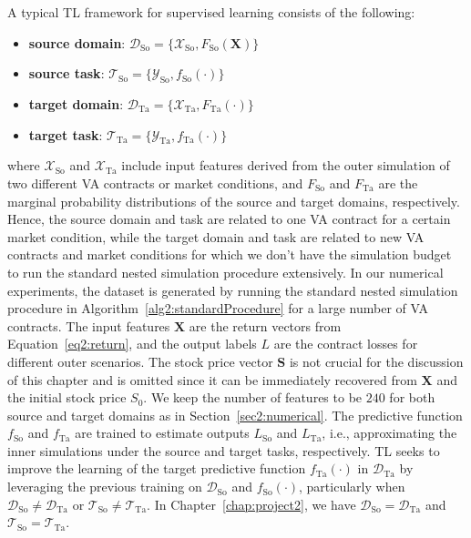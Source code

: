 A typical TL framework for supervised learning consists of the following:
\begin{itemize}
    \item   \textbf{source domain}: $\mathcal{D}_{\text{So}} = \{\mathcal{X}_{\text{So}}, F_{\text{So}}(\mathbf{X})\}$
    \item   \textbf{source task}: $\mathcal{T}_{\text{So}} = \{\mathcal{Y}_{\text{So}}, f_{\text{So}}(\cdot)\}$
    \item   \textbf{target domain}: $\mathcal{D}_{\text{Ta}} = \{\mathcal{X}_{\text{Ta}}, F_{\text{Ta}}(\cdot)\}$
    \item   \textbf{target task}: $\mathcal{T}_{\text{Ta}} = \{\mathcal{Y}_{\text{Ta}}, f_{\text{Ta}}(\cdot)\}$
\end{itemize}
where $\mathcal{X}_{\text{So}}$ and $\mathcal{X}_{\text{Ta}}$ include input features derived from the outer simulation of two different VA contracts or market conditions, and $F_{\text{So}}$ and $F_{\text{Ta}}$ are the marginal probability distributions of the source and target domains, respectively.
Hence, the source domain and task are related to one VA contract for a certain market condition, while the target domain and task are related to new VA contracts and market conditions for which we don't have the simulation budget to run the standard nested simulation procedure extensively.
In our numerical experiments, the dataset is generated by running the standard nested simulation procedure in Algorithm~\ref{alg2:standardProcedure} for a large number of VA contracts.
The input features $\mathbf{X}$ are the return vectors from Equation~\eqref{eq2:return}, and the output labels $L$ are the contract losses for different outer scenarios.
The stock price vector $\mathbf{S}$ is not crucial for the discussion of this chapter and is omitted since it can be immediately recovered from $\mathbf{X}$ and the initial stock price $S_0$.
We keep the number of features to be $\num{240}$ for both source and target domains as in Section~\ref{sec2:numerical}.
The predictive function $f_{\text{So}}$ and $f_{\text{Ta}}$ are trained to estimate outputs $L_{\text{So}}$ and $L_{\text{Ta}}$, i.e., approximating the inner simulations under the source and target tasks, respectively.
TL seeks to improve the learning of the target predictive function $f_{\text{Ta}}(\cdot)$ in $\mathcal{D}_{\text{Ta}}$ by leveraging the previous training on $\mathcal{D}_{\text{So}}$ and $f_{\text{So}}(\cdot)$, particularly when $\mathcal{D}_{\text{So}} \neq \mathcal{D}_{\text{Ta}}$ or $\mathcal{T}_{\text{So}} \neq \mathcal{T}_{\text{Ta}}$.
In Chapter~\ref{chap:project2}, we have $\mathcal{D}_{\text{So}} = \mathcal{D}_{\text{Ta}}$ and $\mathcal{T}_{\text{So}} = \mathcal{T}_{\text{Ta}}$.

